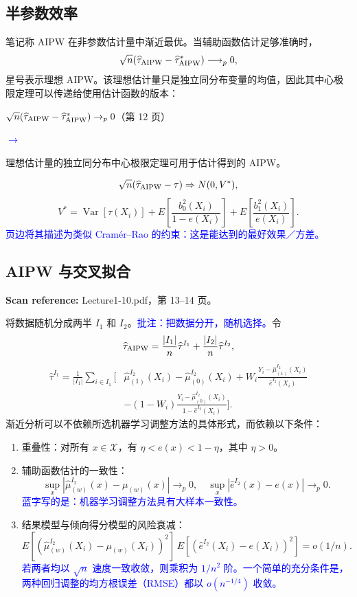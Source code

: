 \documentclass[11pt,a4paper]{article}
\newcommand{\sourcepages}[1]{\par{\small\sffamily\color{muted}\textbf{Scan reference:} #1\par}\nobreak\smallskip\nopagebreak[4]}
\newcommand{\inkblue}[1]{\textcolor{blue}{#1}}
\newcommand{\notearrow}[3]{%
\par\Needspace{6\baselineskip}\smallskip
\noindent\begin{minipage}[c]{0.43\linewidth}\raggedright\color{#1}#2\end{minipage}%
\hfill\textcolor{#1}{\(\longrightarrow\)}\hfill%
\begin{minipage}[c]{0.43\linewidth}\raggedright#3\end{minipage}\par\smallskip}
\begin{document}
\subsection{半参数效率}
笔记称 AIPW 在非参数估计量中渐近最优。当辅助函数估计足够准确时，
\[
\sqrt n(\widehat\tau_{\rm AIPW}-\widehat\tau^*_{\rm AIPW})\longrightarrow_p0,
\]
星号表示理想 AIPW。该理想估计量只是独立同分布变量的均值，因此其中心极限定理可以传递给使用估计函数的版本：
\notearrow{blue}{$\sqrt n(\widehat\tau_{\rm AIPW}-\widehat\tau^*_{\rm AIPW})\to_p0$（第 12 页）}{理想估计量的独立同分布中心极限定理可用于估计得到的 AIPW。}

\[
\sqrt n(\widehat\tau_{\rm AIPW}-\tau)\Rightarrow N(0,V^*),
\]
\[
V^*=\operatorname{Var}[\tau(X_i)]
+E\left[\frac{b_0^2(X_i)}{1-e(X_i)}\right]
+E\left[\frac{b_1^2(X_i)}{e(X_i)}\right].
\]
\inkblue{页边将其描述为类似 Cramér--Rao 的约束：这是能达到的最好效果／方差。}
\subsection{AIPW 与交叉拟合}
\sourcepages{Lecture1-10.pdf，第 13--14 页。}
将数据随机分成两半 $I_1$ 和 $I_2$。\inkblue{批注：把数据分开，随机选择。}令
\[
\widehat\tau_{\rm AIPW}=\frac{|I_1|}{n}\widehat\tau^{I_1}
+\frac{|I_2|}{n}\widehat\tau^{I_2},
\]
\begin{align*}
\widehat\tau^{I_1}=\frac1{|I_1|}\sum_{i\in I_1}\bigg[&\widehat\mu_{(1)}^{I_2}(X_i)-\widehat\mu_{(0)}^{I_2}(X_i)
+W_i\frac{Y_i-\widehat\mu_{(1)}^{I_2}(X_i)}{\widehat e^{I_2}(X_i)}\\
&-(1-W_i)\frac{Y_i-\widehat\mu_{(0)}^{I_2}(X_i)}{1-\widehat e^{I_2}(X_i)}\bigg].
\end{align*}
渐近分析可以不依赖所选机器学习调整方法的具体形式，而依赖以下条件：
\begin{enumerate}
\item 重叠性：对所有 $x\in\mathcal X$，有 $\eta<e(x)<1-\eta$，其中 $\eta>0$。
\item 辅助函数估计的一致性：
\[
\sup_x|\widehat\mu_{(w)}^{I_2}(x)-\mu_{(w)}(x)|\longrightarrow_p0,
\quad \sup_x|\widehat e^{I_2}(x)-e(x)|\longrightarrow_p0.
\]
\inkblue{蓝字写的是：机器学习调整方法具有大样本一致性。}
\item 结果模型与倾向得分模型的风险衰减：
\[
E[(\widehat\mu_{(w)}^{I_2}(X_i)-\mu_{(w)}(X_i))^2]\,
E[(\widehat e^{I_2}(X_i)-e(X_i))^2]=o(1/n).
\]
\inkblue{若两者均以 $\sqrt n$ 速度一致收敛，则乘积为 $1/n^2$ 阶。一个简单的充分条件是，两种回归调整的均方根误差（RMSE）都以 $o(n^{-1/4})$ 收敛。}
\end{enumerate}
\end{document}
